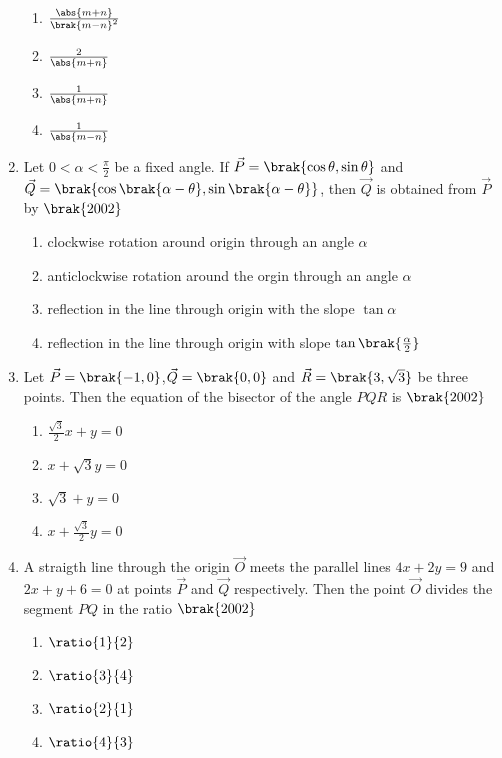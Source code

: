 \begin{enumerate}
\begin{multicols}{4}
\begin{enumerate}
     \item $\frac{\abs{m+n}}{\brak{m-n}^2}$
     \item $\frac{2}{\abs{m+n}}$
     \item $\frac{1}{\abs{m+n}}$
     \item $\frac{1}{\abs{m-n}}$
    
\end{enumerate}
\end{multicols}
\item Let $0 < \alpha < \frac{\pi}{2}$ be a fixed angle. If
$\vec{P}=\brak{\cos\theta,\sin\theta}$ and $\vec{Q}=\brak{\cos\brak{\alpha-\theta}, \sin\brak{\alpha-\theta}}$, then $\vec{Q}$ is obtained from $\vec{P}$ by
\hfill{$\brak{2002}$}
\begin{enumerate}
    \item clockwise rotation around origin through an angle $\alpha$
    \item anticlockwise rotation around the orgin through an angle $\alpha$
    \item reflection in the line through origin with the slope $\tan\alpha$
    \item reflection in the line through origin with slope $\tan\brak{\frac{\alpha}{2}}$
\end{enumerate}
\item Let $\vec{P}=\brak{-1,0}$,$\vec{Q}=\brak{0,0}$ and $\vec{R}=\brak{3,\sqrt{3}}$ be three points. Then the equation of the bisector of the angle $PQR$ is 
\hfill{$\brak{2002}$}
\begin{multicols}{2}
\begin{enumerate}
    
        \item $\frac{\sqrt{3}}{2}x+y=0$
        \item $x+\sqrt{3}y=0$
        \item $\sqrt{3}+y=0$
        \item $x+\frac{\sqrt{3}}{2}y=0$
    
\end{enumerate}
\end{multicols}
\item A straigth line through the origin $\vec{O}$ meets the parallel lines $4x+2y=9$ and $2x+y+6=0$ at points $\vec{P}$ and $\vec{Q}$ respectively. Then the point $\vec{O}$ divides the segment $PQ$ in the ratio 
\hfill{$\brak{2002}$}
\begin{multicols}{4}
\begin{enumerate}

     \item $\ratio{1}{2}$
     \item $\ratio{3}{4}$
     \item $\ratio{2}{1}$
     \item $\ratio{4}{3}$


\end{enumerate}
\end{multicols}
\end{enumerate}
